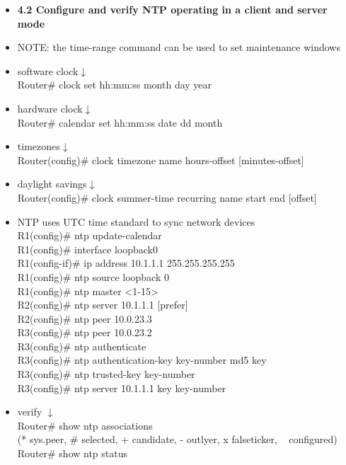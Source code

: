 \documentclass{article}
\begin{document}
\begin{itemize}
  \item \textbf{4.2 Configure and verify NTP operating in a client and server mode}
  	\item[] NOTE: the time-range command can be used to set maintenance windows\\
  	\item[] software clock$\downarrow$\\
		Router\# clock set hh:mm:ss month day year
	\item[] hardware clock$\downarrow$\\
		Router\# calendar set hh:mm:ss date dd month
	\item[] timezones$\downarrow$\\
		Router(config)\# clock timezone name hours-offset [minutes-offset]
	\item[] daylight savings$\downarrow$\\
		Router(config)\# clock summer-time recurring name start end [offset]
	\item[] NTP uses UTC time standard to sync network devices\\
		R1(config)\# ntp update-calendar\\
		R1(config)\# interface loopback0\\
		R1(config-if)\# ip address 10.1.1.1 255.255.255.255\\
		R1(config)\# ntp source loopback 0\\
		R1(config)\# ntp master \textless 1-15\textgreater\\
		R2(config)\# ntp server 10.1.1.1 [prefer]\\
		R2(config)\# ntp peer 10.0.23.3\\
		R3(config)\# ntp peer 10.0.23.2\\
		R3(config)\# ntp authenticate\\
		R3(config)\# ntp authentication-key key-number md5 key\\
		R3(config)\# ntp trusted-key key-number\\
		R3(config)\# ntp server 10.1.1.1 key key-number
	\item[] verify $\downarrow$\\
		Router\# show ntp associations\\
		(* sys.peer, \# selected, + candidate, - outlyer, x falseticker, ~ configured)\\
		Router\# show ntp status
		

\end{itemize}
\end{document}
